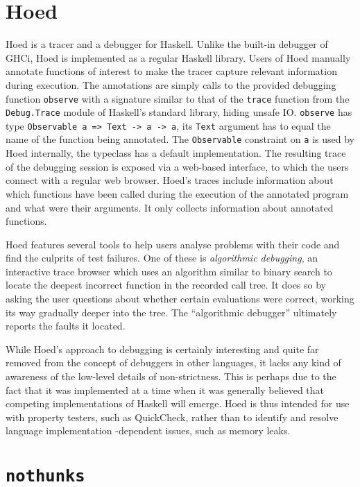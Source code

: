 \documentclass[thesis=B,english]{FITthesis}[2019/12/23]
\begin{document}
\section{Hoed}
Hoed\cite{gh-hoed} is a tracer and a debugger for Haskell. Unlike the built-in
debugger of GHCi, Hoed is implemented as a regular Haskell library. Users of
Hoed manually annotate functions of interest to make the tracer capture
relevant information during execution. The annotations are simply calls to the
provided debugging function \texttt{observe} with a signature similar to that
of the \texttt{trace} function from the \texttt{Debug.Trace} module of
Haskell's standard library, hiding unsafe IO. \texttt{observe} has type
\texttt{Observable a => Text -> a -> a}, its \texttt{Text} argument has to
equal the name of the function being annotated. The \texttt{Observable}
constraint on \texttt{a} is used by Hoed internally, the typeclass has a
default implementation. The resulting trace of the debugging session is exposed
via a web-based interface, to which the users connect with a regular web
browser.  Hoed's traces include information about which functions have been
called during the execution of the annotated program and what were their
arguments. It only collects information about annotated functions.

Hoed features several tools to help users analyse problems with their code and
find the culprits of test failures. One of these is \textit{algorithmic
debugging}, an interactive trace browser which uses an algorithm similar to
binary search to locate the deepest incorrect function in the recorded call
tree. It does so by asking the user questions about whether certain evaluations
were correct, working its way gradually deeper into the tree. The ``algorithmic
debugger'' ultimately reports the faults it located.

While Hoed's approach to debugging is certainly interesting and quite far
removed from the concept of debuggers in other languages, it lacks any kind of
awareness of the low-level details of non-strictness. This is perhaps due to
the fact that it was implemented at a time when it was generally believed that
competing implementations of Haskell will emerge. %
Hoed is thus intended for use with property testers, such as QuickCheck, %
rather than to identify and resolve language implementation -dependent issues,
such as memory leaks.

\section{\texttt{nothunks}}
\end{document}
